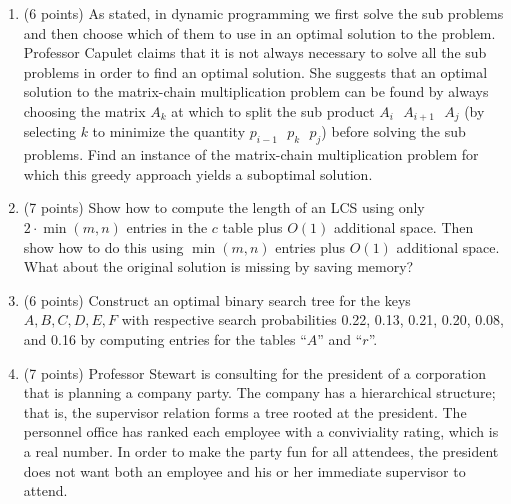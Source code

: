 \documentclass[5]{cs430homework}
\begin{document}
\maketitle

\begin{enumerate}[label=\arabic*.]
	\item (6 points) As stated, in dynamic programming we first solve the sub problems and then choose which of them to use in an optimal solution to the problem. Professor Capulet claims that it is not always necessary to solve all the sub problems in order to find an optimal solution. She suggests that an optimal solution to the matrix-chain multiplication problem can be found by always choosing the matrix $A_{k}$ at which to split the sub product $A_{i}\mbox{ } A_{i+1}\mbox{ } A_{j}$ (by selecting $k$ to minimize the quantity $p_{i-1}\mbox{ } p_{k}\mbox{ }  p_{j}$) before solving the sub problems. Find an instance of the matrix-chain multiplication problem for which this greedy approach yields a suboptimal solution.
	\item (7 points) Show how to compute the length of an LCS using only $2\cdotp\min(m, n)$ entries in the $c$ table plus $O(1)$ additional space. Then show how to do this using $\min(m, n)$ entries plus $O(1)$ additional space. What about the original solution is missing by saving memory?
	\item (6 points) Construct an optimal binary search tree for the keys $A, B, C, D, E, F$ with respective search probabilities 0.22, 0.13, 0.21, 0.20, 0.08, and 0.16 by computing entries for the tables ``$A$'' and ``$r$''.
	\item (7 points) Professor Stewart is consulting for the president of a corporation that is planning a company party. The company has a hierarchical structure; that is, the supervisor relation forms a tree rooted at the president. The personnel office has ranked each employee with a conviviality rating, which is a real number. In order to make the party fun for all attendees, the president does not want both an employee and his or her immediate supervisor to attend.\\


\end{enumerate}
\end{document}
